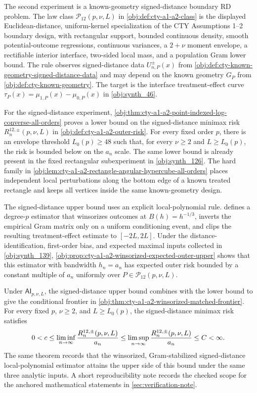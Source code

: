 \documentclass[11pt]{article}
\begin{document}
The second experiment is a known-geometry signed-distance boundary RD problem. The law class \(\mathcal P_{12}(p,\nu,L)\) in \cref{obj:def:cty-a1-a2-class} is the displayed Euclidean-distance, uniform-kernel specialization of the CTY Assumptions 1--2 boundary design, with rectangular support, bounded continuous density, smooth potential-outcome regressions, continuous variances, a \(2+\nu\) moment envelope, a rectifiable interior interface, two-sided local mass, and a population Gram lower bound. The rule observes signed-distance data \(U^{\pm}_{n,P}(x)\) from \cref{obj:def:cty-known-geometry-signed-distance-data} and may depend on the known geometry \(G_P\) from \cref{obj:def:cty-known-geometry}. The target is the interface treatment-effect curve \(\tau_P(x)=\mu_{1,P}(x)-\mu_{0,P}(x)\) in \cref{obj:synth_46}.

For the signed-distance experiment, \cref{obj:thm:cty-a1-a2-point-indexed-log-converse-all-orders} proves a lower bound on the signed-distance minimax risk \(R_n^{12,\pm}(p,\nu,L)\) in \cref{obj:def:cty-a1-a2-outer-risk}. For every fixed order \(p\), there is an envelope threshold \(L_0(p)\ge48\) such that, for every \(\nu\ge2\) and \(L\ge L_0(p)\), the risk is bounded below on the \(a_n\) scale. The same lower bound is already present in the fixed rectangular subexperiment in \cref{obj:synth_126}. The hard family in \cref{obj:lem:cty-a1-a2-rectangle-angular-hypercube-all-orders} places independent local perturbations along the bottom edge of a known treated rectangle and keeps all vertices inside the same known-geometry design.

The signed-distance upper bound uses an explicit local-polynomial rule.  defines a degree-\(p\) estimator that winsorizes outcomes at \(B(h)=h^{-1/3}\), inverts the empirical Gram matrix only on a uniform conditioning event, and clips the resulting treatment-effect estimate to \([-2L,2L]\). Under the distance-identification, first-order bias, and expected maximal inputs collected in \cref{obj:synth_139}, \cref{obj:prop:cty-a1-a2-winsorized-expected-outer-upper} shows that this estimator with bandwidth \(h_n=a_n\) has expected outer risk bounded by a constant multiple of \(a_n\) uniformly over \(P\in\mathcal P_{12}(p,\nu,L)\).

Under \(\mathsf{AI}_{p,\nu,L}\), the signed-distance upper bound combines with the lower bound to give the conditional frontier in \cref{obj:thm:cty-a1-a2-winsorized-matched-frontier}. For every fixed \(p\), \(\nu\ge2\), and \(L\ge L_0(p)\), the signed-distance minimax risk satisfies
\[
0<c
\le
\liminf_{n\to\infty}{R_n^{12,\pm}(p,\nu,L)\over a_n}
\le
\limsup_{n\to\infty}{R_n^{12,\pm}(p,\nu,L)\over a_n}
\le C<\infty.
\]
The same theorem records that the winsorized, Gram-stabilized signed-distance local-polynomial estimator attains the upper side of this bound under the same three analytic inputs. A short reproducibility note records the checked scope for the anchored mathematical statements in \cref{sec:verification-note}.
\end{document}

